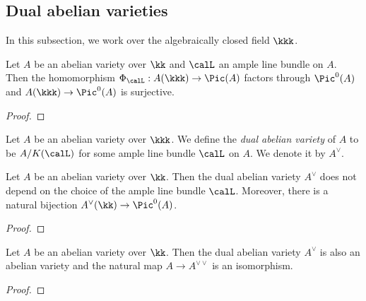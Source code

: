 

\subsection{Dual abelian varieties}

    In this subsection, we work over the algebraically closed field \(\kkk\).

    \begin{proposition}\label{prop:ample_line_bundles_induce_surjective_homomorphisms}
        Let \(A\) be an abelian variety over \(\kk\) and \(\calL\) an ample line bundle on \(A\).
        Then the homomorphism \(\Phi_\calL: A(\kkk) \to \Pic(A)\) factors through \(\Pic^0(A)\) and \(A(\kkk) \to \Pic^0(A)\) is surjective.
    \end{proposition}
    \begin{proof}
    \end{proof}

    \begin{definition}\label{def:dual_abelian_variety}
        Let \(A\) be an abelian variety over \(\kkk\).
        We define the \emph{dual abelian variety} of \(A\) to be \(A/K(\calL)\) for some ample line bundle \(\calL\) on \(A\).
        We denote it by \(A^\vee\).
    \end{definition}

    \begin{theorem}\label{thm:dual_abelian_variety_as_Pic0}
        Let $A$ be an abelian variety over $\kk$. 
        Then the dual abelian variety \(A^\vee\) does not depend on the choice of the ample line bundle \(\calL\).
        Moreover, there is a natural bijection \(A^\vee(\kk) \to \Pic^0(A)\).
    \end{theorem}
    \begin{proof}
    \end{proof}

    \begin{proposition}\label{prop:dual_of_dual_is_A}
        Let \(A\) be an abelian variety over \(\kk\).
        Then the dual abelian variety \(A^\vee\) is also an abelian variety and the natural map \(A \to A^{\vee\vee}\) is an isomorphism.
    \end{proposition}
    \begin{proof}
    \end{proof}

